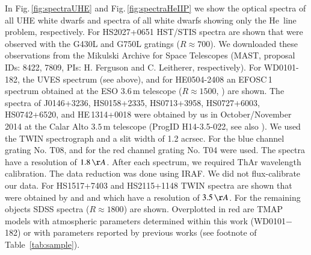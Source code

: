 \documentclass{aa}
\newcounter{Rco}
\newcommand{\Ionst}[1]{\setcounter{Rco}{#1}\Roman{Rco}}
\newcommand{\Ion}[2]{\mbox{#1\,{\scriptsize\Ionst{#2}}}}
\newcommand{\fg}[1]{\mbox{Fig.\,\ref{#1}}}
\begin{document}
In \fg{fig:spectraUHE} and \fg{fig:spectraHeIIP} we show the optical spectra of
all UHE white dwarfs and spectra of all white dwarfs showing only the
\Ion{He}{2} line problem, respectively.
For HS2027+0651 HST/STIS spectra are shown that were
  observed with the G430L and G750L gratings ($R\approx700$).
  We downloaded these observations from the Mikulski Archive for
Space Telescopes (MAST, proposal IDs:
8422, 7809, PIs: H. Ferguson and C. Leitherer, respectively).
For WD0101-182, the UVES spectrum (see above), and for
HE0504-2408 an EFOSC\,1 spectrum obtained at the
ESO 3.6\,m telescope ($R\approx1500$, \citealt{Werner+1995}) are
shown. The spectra of J0146+3236, HS0158+2335, HS0713+3958, HS0727+6003,
HS0742+6520, and HE\,1314+0018 were obtained by us in
October/November 2014 at the Calar Alto $3.5$\,m telescope
(ProgID H14-3.5-022, see also \citealt{Reindl+2019}). We used
the TWIN spectrograph and a slit width of 1.2 acrsec.
For the blue channel grating No. T08, and for the red channel grating
No. T04 were used. The spectra have a
resolution of $1.8\,\AA$. After each spectrum, we required
ThAr wavelength calibration. The data reduction was done
using IRAF. We did not flux-calibrate our data.
For HS1517+7403 and HS2115+1148 TWIN spectra are shown
that were obtained by \cite{Dreizler+1995} and
\cite{DreizlerHeber1998} and which have a resolution of
$3.5\,\AA$. For the remaining objects SDSS spectra ($R\approx1800$)
are shown. Overplotted in red are \textsc{TMAP} models with atmospheric
parameters determined within this work (WD0101$-$182) or with
parameters reported by previous works (see footnote of
Table~\ref{tab:sample}).\\
 
\end{document}
